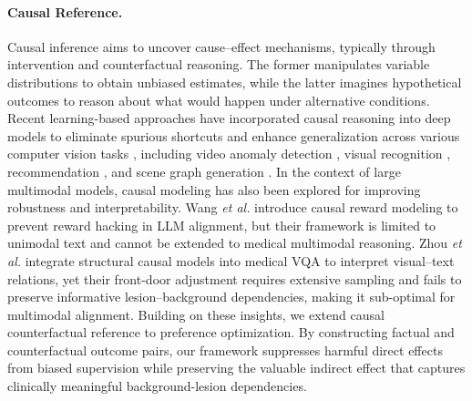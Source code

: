 \paragraph{Causal Reference.}
Causal inference \cite{pearl2009causality} aims to uncover cause–effect mechanisms, typically through intervention and counterfactual reasoning. The former manipulates variable distributions to obtain unbiased estimates, while the latter imagines hypothetical outcomes to reason about what would happen under alternative conditions. Recent learning-based approaches have incorporated causal reasoning into deep models to eliminate spurious shortcuts and enhance generalization across various computer vision tasks \cite{shao2024knowledge,li2024multimodal,zhou2025learning}, including video anomaly detection \cite{liu2025crcl}, visual recognition \cite{liu2022contextual}, recommendation \cite{wang2022causal,wei2022causal}, and scene graph generation \cite{liu2025causal}. In the context of large multimodal models, causal modeling has also been explored for improving robustness and interpretability. Wang \textit{et al.} \cite{wang2025beyond} introduce causal reward modeling to prevent reward hacking in LLM alignment, but their framework is limited to unimodal text and cannot be extended to medical multimodal reasoning. Zhou \textit{et al.} \cite{xu2025structure} integrate structural causal models into medical VQA to interpret visual–text relations, yet their front-door adjustment requires extensive sampling and fails to preserve informative lesion–background dependencies, making it sub-optimal for multimodal alignment. Building on these insights, we extend causal counterfactual reference to preference optimization. By constructing factual and counterfactual outcome pairs, our framework suppresses harmful direct effects from biased supervision while preserving the valuable indirect effect that captures clinically meaningful background-lesion dependencies.
\fi